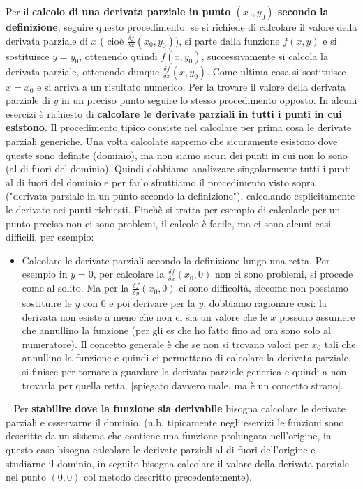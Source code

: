 \newline
Per il \textbf{calcolo di una derivata parziale in punto $(x_0, y_0)$ secondo la definizione}, seguire questo procedimento: se si richiede di calcolare il valore della derivata parziale di $x$ ( cioè $\frac{\delta f}{\delta x}(x_0,y_0)$), si parte dalla funzione $f(x,y)$ e si sostituisce $y= y_0$, ottenendo quindi $f(x,y_0)$, successivamente si calcola la derivata parziale, ottenendo dunque $\frac{\delta f}{\delta x} (x,y_0)$. Come ultima cosa si sostituisce $x = x_0$ e si arriva a un risultato numerico. Per la trovare il valore della derivata parziale di $y$ in un preciso punto seguire lo stesso procedimento opposto.\newline
\newline
In alcuni esercizi è richiesto di \textbf{calcolare le derivate parziali in tutti i punti in cui esistono}. Il procedimento tipico consiste nel calcolare per prima cosa le derivate parziali generiche. Una volta calcolate sapremo che sicuramente esistono dove queste sono definite (dominio), ma non siamo sicuri dei punti in cui non lo sono (al di fuori del dominio). Quindi dobbiamo analizzare singolarmente tutti i punti al di fuori del dominio e per farlo sfruttiamo il procedimento visto sopra ("derivata parziale in un punto secondo la definizione"), calcolando esplicitamente le derivate nei punti richiesti.
Finchè si tratta per esempio di calcolarle per un punto preciso non ci sono problemi, il calcolo è facile, ma ci sono alcuni casi difficili, per esempio:
\begin{itemize}
    \item Calcolare le derivate parziali secondo la definizione lungo una retta. Per esempio in $y=0$, per calcolare la $\frac{\delta f}{\delta x}(x_0, 0)$ non ci sono problemi, si procede come al solito. Ma per la $\frac{\delta f}{\delta y} (x_0, 0)$ ci sono difficoltà, siccome non possiamo sostituire le $y$ con $0$ e poi derivare per la $y$, dobbiamo ragionare così: la derivata non esiste a meno che non ci sia un valore che le $x$ possono assumere che annullino la funzione (per gli es che ho fatto fino ad ora sono solo al numeratore). Il concetto generale è che se non si trovano valori per $x_0$ tali che annullino la funzione e quindi ci permettano di calcolare la derivata parziale, si finisce per tornare a guardare la derivata parziale generica e quindi a non trovarla per quella retta. [spiegato davvero male, ma è un concetto strano].
\end{itemize}
\ \newline
Per \textbf{stabilire dove la funzione sia derivabile} bisogna calcolare le derivate parziali e osservarne il dominio.\newline
(n.b. tipicamente negli esercizi le funzioni sono descritte da un sistema che contiene una funzione prolungata nell'origine, in questo caso bisogna calcolare le derivate parziali al di fuori dell'origine e studiarne il dominio, in seguito bisogna calcolare il valore della derivata parziale nel punto $(0,0)$ col metodo descritto precedentemente).
